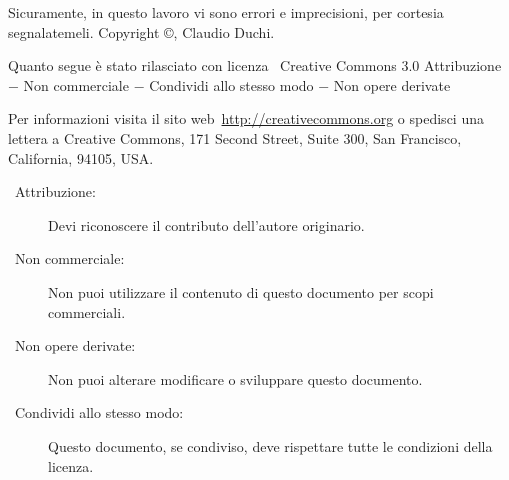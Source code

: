 Sicuramente, in questo lavoro vi sono errori  e imprecisioni, per cortesia segnalatemeli.
\vfill
Copyright \copyright\@ \the\year, Claudio Duchi.

Quanto segue è stato rilasciato con licenza \ccLogo\ Creative Commons   3.0 Attribuzione $-$ Non commerciale $-$ Condividi allo stesso modo $-$ Non opere derivate

Per informazioni visita il sito web\ \url{http://creativecommons.org} o spedisci una lettera a Creative Commons, 171 Second Street, Suite 300, San Francisco, California, 94105, USA.

\begin{description}
\item[\ccAttribution\ Attribuzione:] Devi riconoscere il contributo dell'autore originario.
\item [\ccNonCommercial\ Non commerciale:] Non puoi utilizzare il contenuto di questo documento per scopi commerciali.
\item [\ccNoDerivatives\ Non opere derivate:]  Non puoi alterare modificare o sviluppare questo documento.
\item [\ccShareAlike\ Condividi allo stesso modo:]  Questo documento, se condiviso, deve rispettare tutte le condizioni della licenza.
\end{description}

